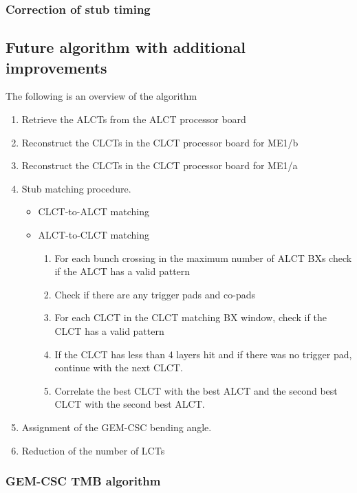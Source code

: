 \subsubsection{Correction of stub timing}





\subsection{Future algorithm with additional improvements}

The following is an overview of the algorithm 

\begin{enumerate}
\item Retrieve the ALCTs from the ALCT processor board
\item Reconstruct the CLCTs in the CLCT processor board for ME1/b
\item Reconstruct the CLCTs in the CLCT processor board for ME1/a
\item Stub matching procedure.
\begin{itemize}
\item CLCT-to-ALCT matching
\item ALCT-to-CLCT matching
\begin{enumerate}
\item For each bunch crossing in the maximum number of ALCT BXs check if the ALCT has a valid pattern
\item Check if there are any trigger pads and co-pads
\item For each CLCT in the CLCT matching BX window, check if the CLCT has a valid pattern
\item If the CLCT has less than 4 layers hit and if there was no trigger pad, continue with the next CLCT. 
\item Correlate the best CLCT with the best ALCT and the second best CLCT with the second best ALCT.
\end{enumerate}
\end{itemize}
\item Assignment of the GEM-CSC bending angle. 
\item Reduction of the number of LCTs 
\end{enumerate}

\subsubsection{GEM-CSC TMB algorithm}
\label{subsec:gem_csc_tmb_algorithm}

